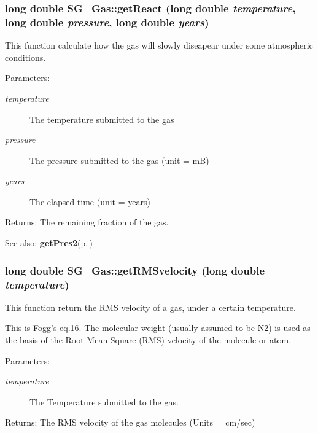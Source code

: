 \subsubsection{\setlength{\rightskip}{0pt plus 5cm}long double SG\_\-Gas::get\-React (long double {\em temperature}, long double {\em pressure}, long double {\em years})}\label{class_s_g___gas_a8}


This function calculate how the gas will slowly diseapear under some atmospheric conditions. 

\begin{Desc}
\item[Parameters:]
\begin{description}
\item[{\em temperature}]The temperature submitted to the gas \item[{\em pressure}]The pressure submitted to the gas (unit = m\-B) \item[{\em years}]The elapsed time (unit = years) \end{description}
\end{Desc}
\begin{Desc}
\item[Returns:]The remaining fraction of the gas. \end{Desc}
\begin{Desc}
\item[See also:]{\bf get\-Pres2}{\rm (p.\,\pageref{class_s_g___gas_b0})} \end{Desc}
\subsubsection{\setlength{\rightskip}{0pt plus 5cm}long double SG\_\-Gas::get\-RMSvelocity (long double {\em temperature})\hspace{0.3cm}{\tt  [protected]}}\label{class_s_g___gas_b1}


This function return the RMS velocity of a gas, under a certain temperature. 

This is Fogg's eq.16. The molecular weight (usually assumed to be N2) is used as the basis of the Root Mean Square (RMS) velocity of the molecule or atom. \begin{Desc}
\item[Parameters:]
\begin{description}
\item[{\em temperature}]The Temperature submitted to the gas. \end{description}
\end{Desc}
\begin{Desc}
\item[Returns:]The RMS velocity of the gas molecules (Units = cm/sec) \end{Desc}
